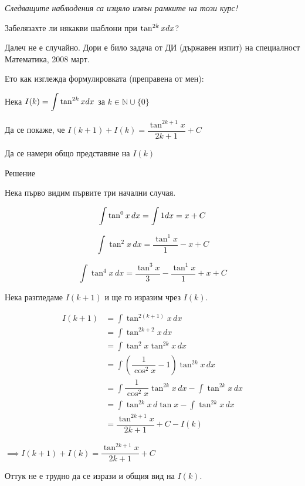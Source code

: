 \documentclass{scrartcl}
\begin{document}
\begin{FlushLeft}
\emph{Следващите наблюдения са изцяло извън рамките на този курс!}

\hfill

Забелязахте ли някакви шаблони при $\tan^{2k}{x}\space dx$?

Далеч не е случайно. Дори е било задача от ДИ (държавен изпит) на специалност Математика, 2008 март.

\hfill

Ето как изглежда формулировката (преправена от мен):

Нека $I(k) = \displaystyle \int \tan^{2k}{x} \space dx$ за $k \in \mathbb{N}\cup \{0\}$

Да се покаже, че $I(k+1) + I(k) = \dfrac{\tan^{2k+1}{x}}{2k+1} + C$

Да се намери общо представяне на $I(k)$

\vspace{5pt}

Решение

Нека първо видим първите три начални случая.

$$\displaystyle \int \tan^0{x}\, dx = \int 1 \space dx = x + C$$

$$\displaystyle \int \tan^2{x}\, dx = \dfrac{\tan^1{x}}{1} - x + C$$

$$\displaystyle \int \tan^4{x}\, dx = \dfrac{\tan^3{x}}{3} - \dfrac{\tan^1{x}}{1} + x + C$$

Нека разгледаме $I(k+1)$ и ще го изразим чрез $I(k)$.
\end{FlushLeft}

\begin{align*}
I(k+1)
&= \displaystyle \int \tan^{2(k+1)}{x}\,dx\\
&= \displaystyle \int \tan^{2k+2}{x}\,dx\\
&= \displaystyle \int \tan^2{x}\tan^{2k}{x}\,dx\\
&= \displaystyle \int \left(\dfrac{1}{\cos^2{x}} - 1\right)\tan^{2k}{x}\,dx\\
&= \displaystyle \int \dfrac{1}{\cos^2{x}}\tan^{2k}{x}\,dx - \int \tan^{2k}{x}\,dx\\
&= \displaystyle \int \tan^{2k}{x}\,d\tan{x} - \int \tan^{2k}{x}\,dx\\
&= \dfrac{\tan^{2k+1}{x}}{2k+1} + C - I(k)
\end{align*}

$\implies I(k+1) + I(k) = \dfrac{\tan^{2k+1}{x}}{2k+1} + C$

Оттук не е трудно да се изрази и общия вид на $I(k)$.
\end{document}
